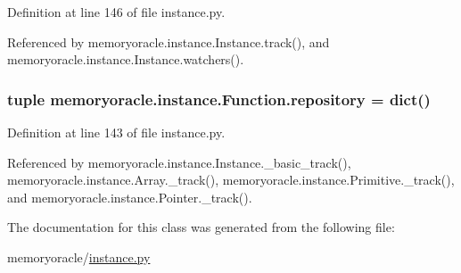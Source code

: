 Definition at line 146 of file instance.\+py.



Referenced by memoryoracle.\+instance.\+Instance.\+track(), and memoryoracle.\+instance.\+Instance.\+watchers().

\hypertarget{classmemoryoracle_1_1instance_1_1Function_ad6a293ac59a9179f3d084476cabd6caa}{}
\subsubsection[{repository}]{\setlength{\rightskip}{0pt plus 5cm}tuple memoryoracle.\+instance.\+Function.\+repository = dict()\hspace{0.3cm}{\ttfamily [static]}}\label{classmemoryoracle_1_1instance_1_1Function_ad6a293ac59a9179f3d084476cabd6caa}


Definition at line 143 of file instance.\+py.



Referenced by memoryoracle.\+instance.\+Instance.\+\_\+basic\+\_\+track(), memoryoracle.\+instance.\+Array.\+\_\+track(), memoryoracle.\+instance.\+Primitive.\+\_\+track(), and memoryoracle.\+instance.\+Pointer.\+\_\+track().



The documentation for this class was generated from the following file\+:\begin{DoxyCompactItemize}
\item 
memoryoracle/\hyperlink{instance_8py}{instance.\+py}\end{DoxyCompactItemize}
